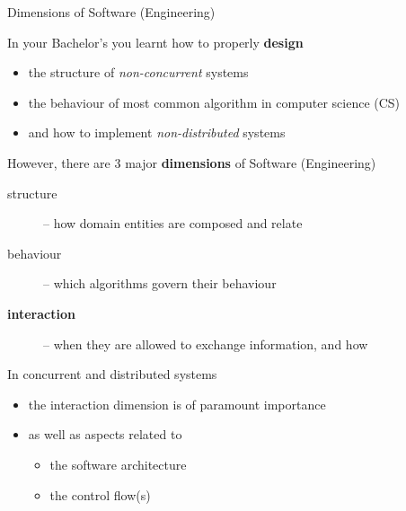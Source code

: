 \documentclass[presentation]{beamer}\mode<presentation>{\usetheme{AMSBolognaFC}}
\begin{document}
\begin{frame}[c,allowframebreaks]{Dimensions of Software (Engineering)}

    \begin{block}{In your Bachelor's you learnt how to properly \textbf{design}}
        \begin{itemize}
            \item the \alert{structure} of \emph{non-concurrent} systems
            \item the \alert{behaviour} of most common algorithm in computer science (CS)
            \item and how to implement \emph{non-distributed} systems
        \end{itemize}
    \end{block}

    \framebreak

    \begin{alertblock}{However, there are 3 major \textbf{dimensions} of Software (Engineering)}
        \begin{description}
            \item[structure] -- how domain entities are composed and relate
            \item[behaviour] -- which algorithms govern their behaviour
            \item[\textbf{interaction}] -- when they are allowed to exchange information, and how
        \end{description}
    \end{alertblock}

    \framebreak

    \begin{exampleblock}{In concurrent and distributed systems}
        \begin{itemize}
            \item the interaction dimension is of paramount importance
            \item as well as aspects related to
            \begin{itemize}
                \item the \alert{software architecture}
                \item the \alert{control flow(s)}
            \end{itemize}
        \end{itemize}
    \end{exampleblock}


\end{frame}
\end{document}
